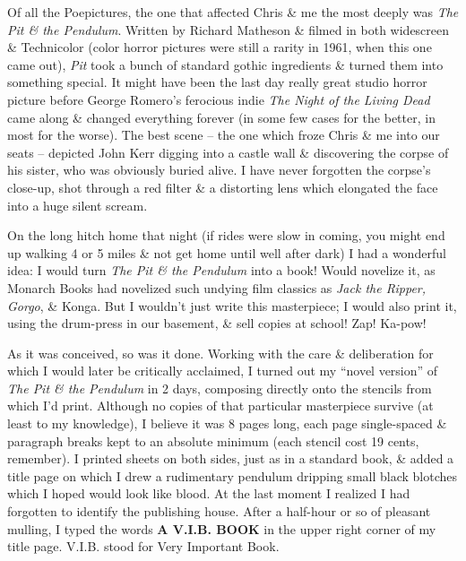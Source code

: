 \documentclass{article}
\numberwithin{equation}{section}
\begin{document}
Of all the Poepictures, the one that affected Chris \& me the most deeply was \textit{The Pit \& the Pendulum}. Written by Richard Matheson \& filmed in both widescreen \& Technicolor (color horror pictures were still a rarity in 1961, when this one came out), \textit{Pit} took a bunch of standard gothic ingredients \& turned them into something special. It might have been the last day really great studio horror picture before George Romero's ferocious indie \textit{The Night of the Living Dead} came along \& changed everything forever (in some few cases for the better, in most for the worse). The best scene -- the one which froze Chris \& me into our seats -- depicted John Kerr digging into a castle wall \& discovering the corpse of his sister, who was obviously buried alive. I have never forgotten the corpse's close-up, shot through a red filter \& a distorting lens which elongated the face into a huge silent scream.

On the long hitch home that night (if rides were slow in coming, you might end up walking 4 or 5 miles \& not get home until well after dark) I had a wonderful idea: I would turn \textit{The Pit \& the Pendulum} into a book! Would novelize it, as Monarch Books had novelized such undying film classics as \textit{Jack the Ripper, Gorgo}, \& Konga. But I wouldn't just write this masterpiece; I would also print it, using the drum-press in our basement, \& sell copies at school! Zap! Ka-pow!

As it was conceived, so was it done. Working with the care \& deliberation for which I would later be critically acclaimed, I turned out my ``novel version'' of \textit{The Pit \& the Pendulum} in 2 days, composing directly onto the stencils from which I'd print. Although no copies of that particular masterpiece survive (at least to my knowledge), I believe it was 8 pages long, each page single-spaced \& paragraph breaks kept to an absolute minimum (each stencil cost 19 cents, remember). I printed sheets on both sides, just as in a standard book, \& added a title page on which I drew a rudimentary pendulum dripping small black blotches which I hoped would look like blood. At the last moment I realized I had forgotten to identify the publishing house. After a half-hour or so of pleasant mulling, I typed the words \textbf{A V.I.B. BOOK} in the upper right corner of my title page. V.I.B. stood for Very Important Book.
\end{document}
